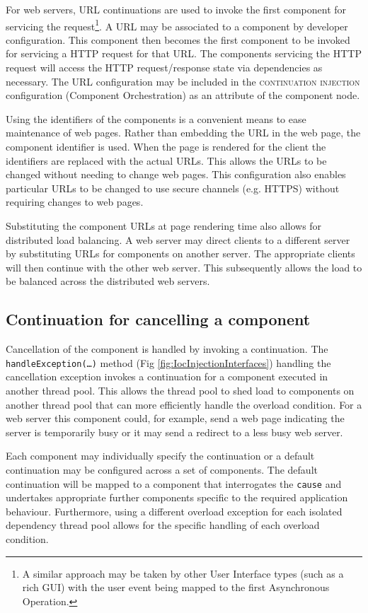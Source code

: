 \documentclass[prodmode]{style/acmlarge}
\begin{document}
For web servers, URL continuations \cite{url-continuation} are used to invoke
the first component for servicing the request\footnote{A similar approach may be
taken by other User Interface types (such as a rich GUI) with the user event
being mapped to the first Asynchronous Operation.}.  A URL may be associated to
a component by developer configuration.  This component then becomes the first
component to be invoked for servicing a HTTP request for that URL.  The
components servicing the HTTP request will access the HTTP request/response
state via dependencies as necessary.  The URL configuration may be included in
the \textsc{continuation injection} configuration (Component Orchestration) as
an attribute of the component node.

Using the identifiers of the components is a convenient means to ease
maintenance of web pages.  Rather than embedding the URL in the web page, the
component identifier is used.  When the page is rendered for the client the
identifiers are replaced with the actual URLs.  This allows the URLs to be
changed without needing to change web pages.  This configuration also enables
particular URLs to be changed to use secure channels (e.g. HTTPS) without
requiring changes to web pages.

Substituting the component URLs at page rendering time also allows for
distributed load balancing.  A web server may direct clients to a different
server by substituting URLs for components on another server. The appropriate
clients will then continue with the other web server.  This subsequently allows the
load to be balanced across the distributed web servers.


\subsection{Continuation for cancelling a component}

Cancellation of the component is handled by invoking a continuation.  The
\texttt{handle\-Exception(\ldots)} method (Fig \ref{fig:IocInjectionInterfaces})
handling the cancellation exception invokes a continuation for a component
executed in another thread pool.  This allows the thread pool to shed load to
components on another thread pool that can more efficiently handle the overload
condition.  For a web server this component could, for example, send a web page
indicating the server is temporarily busy or it may send a redirect to a less
busy web server.

Each component may individually specify the continuation or a default
continuation may be configured across a set of components.
The default continuation will be mapped to a component that interrogates the
\texttt{cause} and undertakes appropriate further components specific to the
required application behaviour.  Furthermore, using a different overload
exception for each isolated dependency thread pool allows for the specific
handling of each overload condition.
\end{document}
